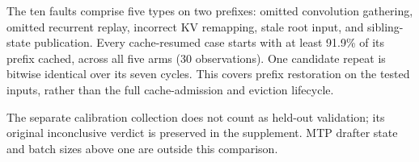 The ten faults comprise five types on two prefixes: omitted convolution gathering, omitted recurrent replay, incorrect KV remapping, stale root input, and sibling-state publication. Every cache-resumed case starts with at least 91.9\% of its prefix cached, across all five arms (30 observations). One candidate repeat is bitwise identical over its seven cycles. This covers prefix restoration on the tested inputs, rather than the full cache-admission and eviction lifecycle.

The separate calibration collection does not count as held-out validation; its original inconclusive verdict is preserved in the supplement. MTP drafter state and batch sizes above one are outside this comparison.
